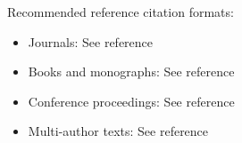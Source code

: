 
Recommended reference citation formats:

\begin{indented}
  \begin{itemize}
    \item Journals: See reference~\cite{wu2004}
    \item Books and monographs: See reference~\cite{levenspiel2002}   
    \item Conference proceedings: See reference~\cite{bock1984}\
    \item Multi-author texts: See reference~\cite{deuflhard1987}  
  \end{itemize}  
\end{indented}
